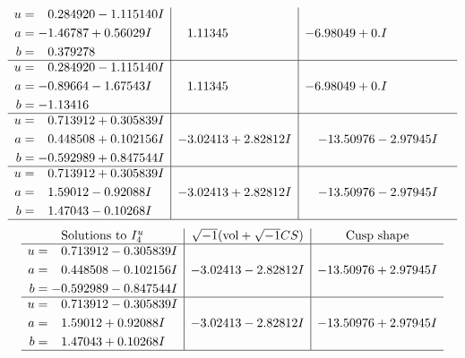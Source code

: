 \documentclass[1p]{elsarticle_modified}
\theoremstyle{definition}
\newcommand{\I}{\sqrt{-1}}
\begin{document}
$$\begin{array}{c|c|c}
\begin{aligned}
u &= \phantom{-}0.284920 - 1.115140 I \\
a &= -1.46787 + 0.56029 I \\
b &= \phantom{-}0.379278\phantom{ +0.000000I}\end{aligned}
 & \phantom{-}1.11345\phantom{ +0.000000I} & -6.98049 + 0. I\phantom{ +0.000000I} \\ \hline\begin{aligned}
u &= \phantom{-}0.284920 - 1.115140 I \\
a &= -0.89664 - 1.67543 I \\
b &= -1.13416\phantom{ +0.000000I}\end{aligned}
 & \phantom{-}1.11345\phantom{ +0.000000I} & -6.98049 + 0. I\phantom{ +0.000000I} \\ \hline\begin{aligned}
u &= \phantom{-}0.713912 + 0.305839 I \\
a &= \phantom{-}0.448508 + 0.102156 I \\
b &= -0.592989 + 0.847544 I\end{aligned}
 & -3.02413 + 2.82812 I & -13.50976 - 2.97945 I \\ \hline\begin{aligned}
u &= \phantom{-}0.713912 + 0.305839 I \\
a &= \phantom{-}1.59012 - 0.92088 I \\
b &= \phantom{-}1.47043 - 0.10268 I\end{aligned}
 & -3.02413 + 2.82812 I & -13.50976 - 2.97945 I\\
 \hline 
 \end{array}$$\newpage$$\begin{array}{c|c|c}  
\text{Solutions to }I^u_{4}& \I (\text{vol} + \sqrt{-1}CS) & \text{Cusp shape}\\
 \hline 
\begin{aligned}
u &= \phantom{-}0.713912 - 0.305839 I \\
a &= \phantom{-}0.448508 - 0.102156 I \\
b &= -0.592989 - 0.847544 I\end{aligned}
 & -3.02413 - 2.82812 I & -13.50976 + 2.97945 I \\ \hline\begin{aligned}
u &= \phantom{-}0.713912 - 0.305839 I \\
a &= \phantom{-}1.59012 + 0.92088 I \\
b &= \phantom{-}1.47043 + 0.10268 I\end{aligned}
 & -3.02413 - 2.82812 I & -13.50976 + 2.97945 I\\
 \hline 
 \end{array}$$\newpage\newpage\renewcommand{\arraystretch}{1}
\end{document}
